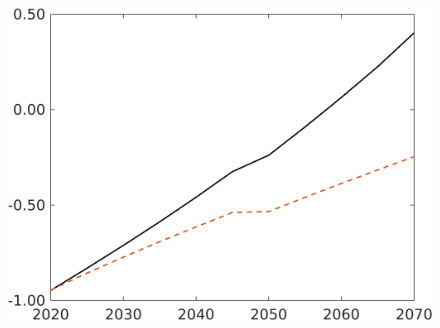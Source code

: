 \begin{figure}[h!!]
\begin{minipage}[]{0.32\textwidth}
	\end{minipage}
	\begin{minipage}[]{0.32\textwidth}
		\includegraphics[width=1\textwidth]{../../codding_model/own_basedOnFried/optimalPol_190722_tidiedUp/figures/all_10Aout22/SWF_CompEffOPT_T_NoTaus_regime3_opteff_spillover0_noskill0_sep1_xgrowth0_countec0_etaa0.79_lgd0_lff0.png}
	\end{minipage}
\end{figure}

